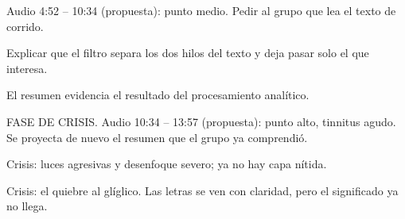 
  {Audio 4:52 -- 10:34 (propuesta): punto medio. Pedir al grupo que lea el
  texto de corrido.}

  {Explicar que el filtro separa los dos hilos del texto y deja pasar solo el
  que interesa.}

  {El resumen evidencia el resultado del procesamiento analítico.}

  {FASE DE CRISIS. Audio 10:34 -- 13:57 (propuesta): punto alto, tinnitus
  agudo. Se proyecta de nuevo el resumen que el grupo ya comprendió.}

  {Crisis: luces agresivas y desenfoque severo; ya no hay capa nítida.}

  {Crisis: el quiebre al glíglico. Las letras se ven con claridad, pero el
  significado ya no llega.}

{%
\begin{frame}[plain]
\end{frame}
}
